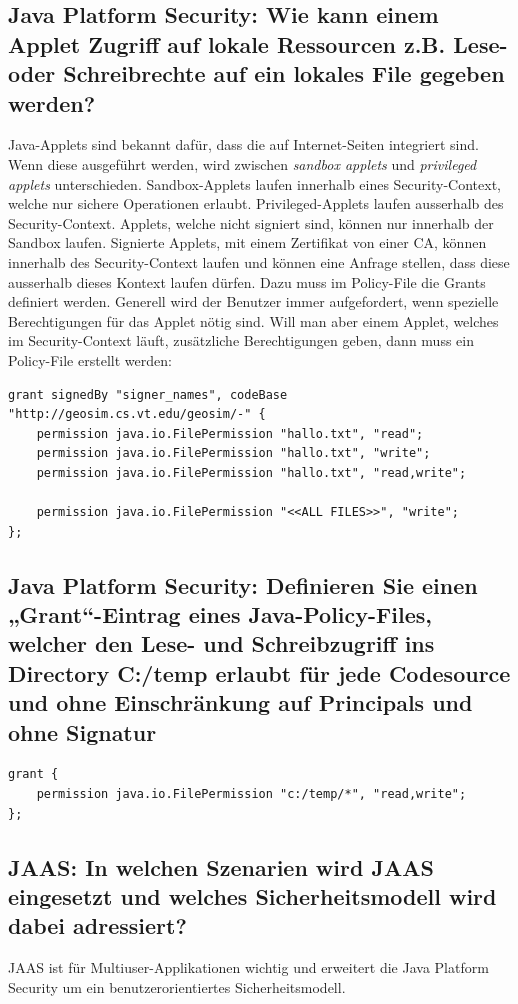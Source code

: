 \subsection{Java Platform Security: Wie kann einem Applet Zugriff auf lokale Ressourcen z.B. Lese- oder Schreibrechte auf ein lokales File gegeben werden?}
Java-Applets sind bekannt dafür, dass die auf Internet-Seiten integriert sind. Wenn diese ausgeführt werden, wird zwischen \emph{sandbox applets} und \emph{privileged applets} unterschieden. Sandbox-Applets laufen innerhalb eines Security-Context, welche nur sichere Operationen erlaubt. Privileged-Applets laufen ausserhalb des Security-Context. Applets, welche nicht signiert sind, können nur innerhalb der Sandbox laufen. Signierte Applets, mit einem Zertifikat von einer CA, können innerhalb des Security-Context laufen und können eine Anfrage stellen, dass diese ausserhalb dieses Kontext laufen dürfen. Dazu muss im Policy-File die Grants definiert werden. Generell wird der Benutzer immer aufgefordert, wenn spezielle Berechtigungen für das Applet nötig sind. Will man aber einem Applet, welches im Security-Context läuft, zusätzliche Berechtigungen geben, dann muss ein Policy-File erstellt werden:

\begin{lstlisting}
grant signedBy "signer_names", codeBase "http://geosim.cs.vt.edu/geosim/-" {
	permission java.io.FilePermission "hallo.txt", "read";
	permission java.io.FilePermission "hallo.txt", "write";
	permission java.io.FilePermission "hallo.txt", "read,write";
	
	permission java.io.FilePermission "<<ALL FILES>>", "write";
};
\end{lstlisting}

\subsection{Java Platform Security: Definieren Sie einen „Grant“-Eintrag eines Java-Policy-Files, welcher den Lese- und Schreibzugriff ins Directory C:/temp erlaubt für jede Codesource und ohne Einschränkung auf Principals und ohne Signatur}

\begin{lstlisting}
grant {
	permission java.io.FilePermission "c:/temp/*", "read,write";
};
\end{lstlisting}

\subsection{JAAS: In welchen Szenarien wird JAAS eingesetzt und welches Sicherheitsmodell wird dabei adressiert?}
JAAS ist für Multiuser-Applikationen wichtig und erweitert die Java Platform Security um ein benutzerorientiertes Sicherheitsmodell.

